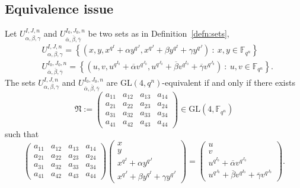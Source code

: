 \documentclass[11pt]{article}
\theoremstyle{definition}
\numberwithin{equation}{section}
\begin{document}
\subsection{Equivalence issue}\label{sec:equivalence}

Let $U_{\alpha, \beta, \gamma}^{I,J,n}$ and $U_{\overline{\alpha}, \overline{\beta}, \overline{\gamma}}^{I_0,J_0,n}$ be two sets as in Definition~\ref{defn:sets},
\begin{equation}
\label{eq:sets:gammaell}
    \begin{split}
        &U_{\alpha, \beta, \gamma}^{I,J,n} =\left\{\left(x,y,x^{q^I}+\alpha y^{q^J},x^{q^J}+\beta y^{q^I} + \gamma y^{q^J}\right) \ : \ x,y\in \mathbb{F}_{q^n}\right\}\\
        &U_{\overline{\alpha}, \overline{\beta}, \overline{\gamma}}^{I_0,J_0,n}=\left\{\left(u,v,u^{q^{I_0}}+\overline{\alpha} v^{q^{J_0}},u^{q^{J_0}}+\overline{\beta} v^{q^{I_0}} + \overline{\gamma} v^{q^{J_0}}\right) \ : \ u,v\in \mathbb{F}_{q^n}\right\}.
    \end{split}
\end{equation}
The sets $U_{\alpha, \beta, \gamma}^{I,J,n}$ and $U_{\overline{\alpha}, \overline{\beta}, \overline{\gamma}}^{I_0,J_0,n}$ are $\textrm{GL}(4,q^n)$-equivalent if and only if there exists 
\begin{equation}
\label{eq:mat:gammaell}
\mathfrak{N}:=\begin{pmatrix}
a_{11}&a_{12}&a_{13}&a_{14}\\
a_{21}&a_{22}&a_{23}&a_{24}\\
a_{31}&a_{32}&a_{33}&a_{34}\\
a_{41}&a_{42}&a_{43}&a_{44}
\end{pmatrix}\in \mathrm{GL}(4,\mathbb{F}_{q^n})
\end{equation}
such that 
\begin{equation*}
\begin{pmatrix}
a_{11}&a_{12}&a_{13}&a_{14}\\
a_{21}&a_{22}&a_{23}&a_{24}\\
a_{31}&a_{32}&a_{33}&a_{34}\\
a_{41}&a_{42}&a_{43}&a_{44}
\end{pmatrix}
\begin{pmatrix}
x\\
y\\
x^{q^I}+\alpha y^{q^J}\\
x^{q^J}+\beta y^{q^I} + \gamma y^{q^J}
\end{pmatrix}=
\begin{pmatrix}
u\\
v\\
u^{q^{I_0}}+\overline{\alpha} v^{q^{J_0}}\\
u^{q^{J_0}}+\overline{\beta} v^{q^{I_0}} + \overline{\gamma} v^{q^{J_0}}
\end{pmatrix}.
\end{equation*}
\end{document}
